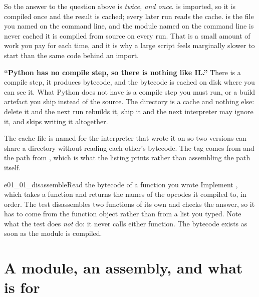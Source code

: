 \noindent
So the answer to the question above is \emph{twice, and once}.
 is imported, so it is compiled once and the result is
cached; every later run reads the cache.  is the file you named
on the command line, and the module named on the command line is never
cached \dash{} it is compiled from source on every run. That is a small
amount of work you pay for each time, and it is why a large script feels
marginally slower to start than the same code behind an import.

\begin{trapbox}
\textbf{\enquote{Python has no compile step, so there is nothing like IL.}}
There is a compile step, it produces bytecode, and the bytecode is cached on
disk where you can see it. What Python does not have is a compile step you
must run, or a build artefact you ship instead of the source. The
 directory is a cache and nothing else: delete it and
the next run rebuilds it, ship it and the next interpreter may ignore it,
and  skips writing it altogether.
\end{trapbox}


\begin{note}
The cache file is named for the interpreter that wrote it \dash{}
 on \pyver{} \dash{} so two versions can share a
directory without reading each other's bytecode. The tag comes from
 and the path from
, which is what the listing prints
rather than assembling the path itself.
\end{note}

\begin{exercise}{e01_01_disassemble}{Read the bytecode of a function you wrote}
Implement , which takes a function and returns the
names of the opcodes it compiled to, in order. The test disassembles two
functions of its own and checks the answer, so it has to come from the
function object rather than from a list you typed. Note what the test does
\emph{not} do: it never calls either function. The bytecode exists as soon
as the module is compiled.
\end{exercise}

\section{A module, an assembly, and what  is for}
\label{sec:ch01-main}

